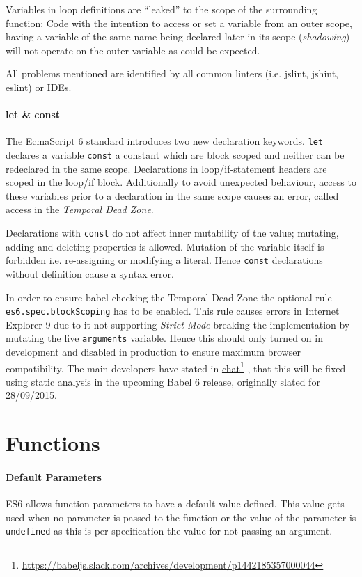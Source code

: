 \documentclass{bioinfo}
\newcommand\fnurl[2]{%
  \href{#1}{#2}\footnote{\url{#1}}%
}
\begin{document}
Variables in loop definitions are ``leaked'' to the scope of the surrounding function; Code
with the intention to access or set a variable from an outer scope, having a variable of
the same name being declared later in its scope ({\em shadowing}) will not operate on the
outer variable as could be expected.

All problems mentioned are identified by all common linters (i.e. jslint, jshint, eslint)
or IDEs.


\paragraph{let \& const\textcolon}
The EcmaScript 6 standard introduces two new declaration keywords. {\tt let} declares
a variable {\tt const} a constant which are block scoped and neither can be redeclared in the
same scope. Declarations in loop/if-statement headers are scoped in the loop/if block.
Additionally to avoid unexpected behaviour, access to these variables prior
to a declaration in the same scope causes an error, called access in
the {\em Temporal Dead Zone}.

Declarations with {\tt const} do not affect inner mutability of the value; mutating, adding and
deleting properties is allowed. Mutation of the variable itself is forbidden i.e. re-assigning
or modifying a literal. Hence {\tt const} declarations without definition cause a syntax error.

In order to ensure babel checking the Temporal Dead Zone the optional rule
{\tt es6.spec.blockScoping} has to be enabled. This rule causes errors in Internet Explorer 9
due to it not supporting {\sl Strict Mode} breaking the implementation by mutating the live
{\tt arguments} variable. Hence this should only turned on in development and disabled in production
to ensure maximum browser compatibility.
The main developers have stated in
\fnurl{https://babeljs.slack.com/archives/development/p1442185357000044}{chat}, that this will
be fixed using static analysis in the upcoming Babel 6 release, originally slated for 28/09/2015.

\section{Functions}
\paragraph{Default Parameters\textcolon}
ES6 allows function parameters to have a default value defined. This value gets used when
no parameter is passed to the function or the value of the parameter is {\tt undefined} as
this is per specification the value for not passing an argument.
\end{document}
